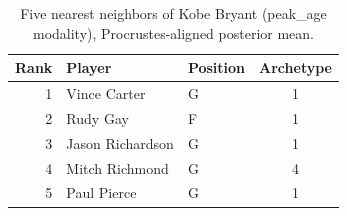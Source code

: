 \begin{table}[htbp]
  \centering\small
  \begin{tabular}{rllc}
    \toprule
    Rank & Player & Position & Archetype \\
    \midrule
    1 & Vince Carter & G & 1 \\
    2 & Rudy Gay & F & 1 \\
    3 & Jason Richardson & G & 1 \\
    4 & Mitch Richmond & G & 4 \\
    5 & Paul Pierce & G & 1 \\
    \bottomrule
  \end{tabular}
  \caption{Five nearest neighbors of Kobe Bryant (peak_age modality), Procrustes-aligned posterior mean.}
  \label{tab:Kobe_Bryant_neighbors_peak_age}
\end{table}

